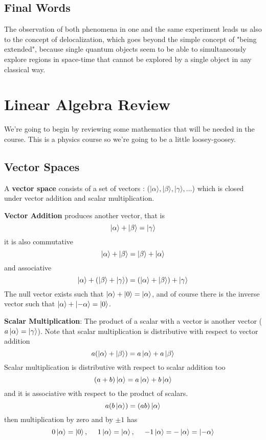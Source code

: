 \documentclass[english, 11pt]{article}
\begin{document}
     \subsection{Final Words}
       The observation of both phenomena in one and the same experiment leads us also to the concept of delocalization, which goes beyond the simple concept of "being extended", because single quantum objects seem to be able to simultaneously explore regions in space-time that cannot be explored by a single object in any classical way.

   \section{Linear Algebra Review}

     We're going to begin by reviewing some mathematics that will be needed in the course. This is a physics course so we're going to be a little loosey-goosey.

     \subsection{Vector Spaces}
        \begin{defn}\label{vector_space}
          A {\bf vector space} consists of a set of vectors : ($|\alpha\rangle, |\beta\rangle, |\gamma\rangle, \ldots$) which is closed under vector addition and scalar multiplication.
        \end{defn}
        {\bf Vector Addition} produces another vector, that is
        \[ \left|\alpha\right\rangle + \left|\beta\right\rangle = \left|\gamma\right\rangle  \]
        it is also commutative
        \[ \left|\alpha\right\rangle + \left|\beta\right\rangle =  \left|\beta\right\rangle  + \left|\alpha\right\rangle \]
        and associative
        \[ \left|\alpha\right\rangle + (\left|\beta\right\rangle + \left|\gamma\right\rangle) =  (\left|\alpha\right\rangle+\left|\beta\right\rangle ) + \left|\gamma\right\rangle \]
        The null vector exists such that $\left|\alpha\right\rangle + \left|0\right\rangle = \left|\alpha\right\rangle$, and of course there is the inverse vector such that $\left|\alpha\right\rangle + \left|-\alpha\right\rangle = \left|0\right\rangle$.
        \newline

        {\bf Scalar Multiplication}: The product of a scalar with a vector is another vector ($a\left|\alpha\right\rangle = \left|\gamma\right\rangle$). Note that scalar multiplication is distributive with respect to vector addition
        \[ a(\left|\alpha\right\rangle + \left|\beta\right\rangle) = a\left|\alpha\right\rangle + a\left|\beta\right\rangle \]
        Scalar multiplication is distributive with respect to scalar addition too
        \[ (a + b)\left|\alpha\right\rangle = a\left|\alpha\right\rangle + b\left|\alpha\right\rangle \]
        and it is associative with respect to the product of scalars.
        \[ a(b \left|\alpha\right\rangle) = (ab)\left|\alpha\right\rangle \]
        then multiplication by zero and by $\pm 1$ has
        \[ 0\ket{\alpha} = \ket{0}, \ \ \ \ 1\ket{\alpha} = \ket{\alpha}, \ \ \ \ -1\ket{\alpha} = -\ket{\alpha} = \ket{-\alpha} \]
        \newline
\end{document}
